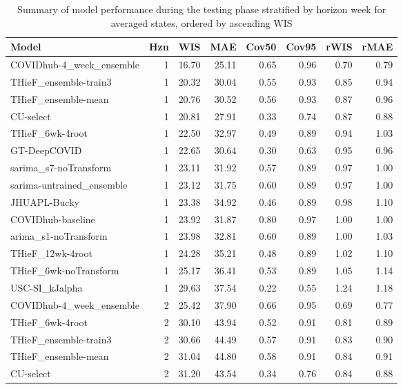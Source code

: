 \documentclass[12pt]{article}
\begin{document}
\begingroup\renewcommand{\arraystretch}{0.75}
\begin{longtable}{lrrrrrrr}
\caption{Summary of model performance during the testing phase stratified by horizon week for averaged states, ordered by ascending WIS} \\ 
  \hline
Model & Hzn & WIS & MAE & Cov50 & Cov95 & rWIS & rMAE \\ 
  \hline
COVIDhub-4\_week\_ensemble & 1 & 16.70 & 25.11 & 0.65 & 0.96 & 0.70 & 0.79 \\ 
  THieF\_ensemble-train3 & 1 & 20.32 & 30.04 & 0.55 & 0.93 & 0.85 & 0.94 \\ 
  THieF\_ensemble-mean & 1 & 20.76 & 30.52 & 0.56 & 0.93 & 0.87 & 0.96 \\ 
  CU-select & 1 & 20.81 & 27.91 & 0.33 & 0.74 & 0.87 & 0.88 \\ 
  THieF\_6wk-4root & 1 & 22.50 & 32.97 & 0.49 & 0.89 & 0.94 & 1.03 \\ 
  GT-DeepCOVID & 1 & 22.65 & 30.64 & 0.30 & 0.63 & 0.95 & 0.96 \\ 
  sarima\_s7-noTransform & 1 & 23.11 & 31.92 & 0.57 & 0.89 & 0.97 & 1.00 \\ 
  sarima-untrained\_ensemble & 1 & 23.12 & 31.75 & 0.60 & 0.89 & 0.97 & 1.00 \\ 
  JHUAPL-Bucky & 1 & 23.38 & 34.92 & 0.46 & 0.89 & 0.98 & 1.10 \\ 
  COVIDhub-baseline & 1 & 23.92 & 31.87 & 0.80 & 0.97 & 1.00 & 1.00 \\ 
  arima\_s1-noTransform & 1 & 23.98 & 32.81 & 0.60 & 0.89 & 1.00 & 1.03 \\ 
  THieF\_12wk-4root & 1 & 24.28 & 35.21 & 0.48 & 0.89 & 1.02 & 1.10 \\ 
  THieF\_6wk-noTransform & 1 & 25.17 & 36.41 & 0.53 & 0.89 & 1.05 & 1.14 \\ 
  USC-SI\_kJalpha & 1 & 29.63 & 37.54 & 0.22 & 0.55 & 1.24 & 1.18 \\ 
  COVIDhub-4\_week\_ensemble & 2 & 25.42 & 37.90 & 0.66 & 0.95 & 0.69 & 0.77 \\ 
  THieF\_6wk-4root & 2 & 30.10 & 43.94 & 0.52 & 0.91 & 0.81 & 0.89 \\ 
  THieF\_ensemble-train3 & 2 & 30.66 & 44.49 & 0.57 & 0.91 & 0.83 & 0.90 \\ 
  THieF\_ensemble-mean & 2 & 31.04 & 44.80 & 0.58 & 0.91 & 0.84 & 0.91 \\ 
  CU-select & 2 & 31.20 & 43.54 & 0.34 & 0.76 & 0.84 & 0.88 \\ 

\end{longtable}
\end{document}
